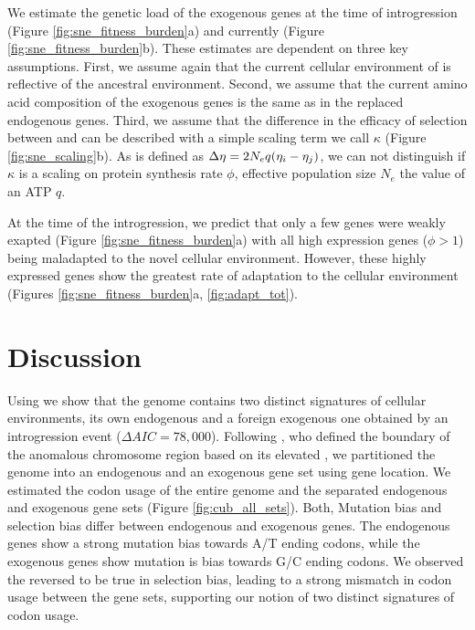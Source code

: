 \documentclass[12pt]{article}
\begin{document}
We estimate the genetic load of the exogenous genes at the time of introgression (Figure \ref{fig:sne_fitness_burden}a) and currently (Figure \ref{fig:sne_fitness_burden}b).
These estimates are dependent on three key assumptions.
First, we assume again that the current cellular environment of \gossypii is reflective of the ancestral environment.
Second, we assume that the current amino acid composition of the exogenous genes is the same as in the replaced endogenous genes.
Third, we assume that the difference in the efficacy of selection between \gossypii and \kluyveri can be described with a simple scaling term we call $\kappa$ (Figure \ref{fig:sne_scaling}b).
As \DE is defined as ${\Delta \eta} = 2N_eq(\eta_i-\eta_j)$, we can not distinguish if $\kappa$ is a scaling on protein synthesis rate $\phi$, effective population size $N_e$ the value of an ATP $q$\citep{gilchrist2015}.

At the time of the introgression, we predict that only a few genes were weakly exapted (Figure \ref{fig:sne_fitness_burden}a) with all high expression genes ($\phi > 1$) being maladapted to the novel cellular environment.
However, these highly expressed genes show the greatest rate of adaptation to the \kluyveri cellular environment (Figures \ref{fig:sne_fitness_burden}a, \ref{fig:adapt_tot}).

\section*{Discussion}
Using \ROC we show that the \kluyveri genome contains two distinct signatures of cellular environments, its own endogenous and a foreign exogenous one obtained by an introgression event ($\Delta AIC = 78,000$).
Following \citet{payen2009}, who defined the boundary of the anomalous chromosome region based on its elevated \GC, we partitioned the \kluyveri genome into an endogenous and an exogenous gene set using gene location.
We estimated the codon usage of the entire \kluyveri genome and the separated endogenous and exogenous gene sets (Figure \ref{fig:cub_all_sets}).
Both, Mutation bias and selection bias differ between endogenous and exogenous genes.
The endogenous genes show a strong mutation bias towards A/T ending codons, while the exogenous genes show mutation is bias towards G/C ending codons.
We observed the reversed to be true in selection bias, leading to a strong mismatch in codon usage between the gene sets, supporting our notion of two distinct signatures of codon usage.
\end{document}
